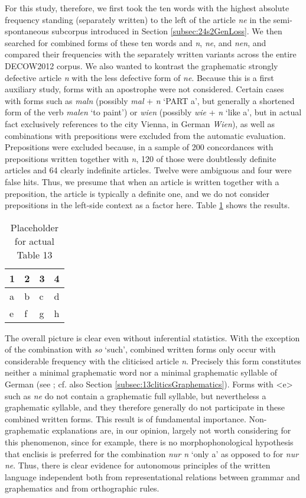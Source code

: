 For this study, therefore, we first took the ten words with the highest absolute frequency standing (separately written) to the left of the article \textit{ne} in the semi-spontaneous subcorpus introduced in Section \ref{subsec:24s2GenLoss}.
We then searched for combined forms of these ten words and \textit{n}, \textit{ne}, and \textit{nen}, and compared their frequencies with the separately written variants across the entire DECOW2012 corpus.
We also wanted to kontrast the graphematic strongly defective article \textit{n} with the less defective form of \textit{ne}.
Because this is a first auxiliary study, forms with an apostrophe were not considered.
Certain cases with forms such as \textit{maln} (possibly \textit{mal} + \textit{n} `\textsc{PART} a', but generally a shortened form of the verb \textit{malen} `to paint') or \textit{wien} (possibly \textit{wie} + \textit{n} `like a', but in actual fact exclusively references to the city Vienna, in German \textit{Wien}), as well as combinations with prepositions were excluded from the automatic evaluation.
Prepositions were excluded because, in a sample of 200 concordances with prepositions written together with \textit{n}, 120 of those were doubtlessly definite articles and 64 clearly indefinite articles.
Twelve were ambiguous and four were false hits.
Thus, we presume that when an article is written together with a preposition, the article is typically a definite one, and we do not consider prepositions in the left-side context as a factor here.
Table \ref{tab:0013} shows the results.

\begin{table}
	\centering
	\begin{tabular}{llll}
		\toprule
		\textbf{1} & \textbf{2} & \textbf{3} & \textbf{4} \\
		\midrule
		a & b & c & d \\
		e & f & g & h \\
		\bottomrule
	\end{tabular}
	\caption{Placeholder for actual Table 13}
	\label{tab:0013}
\end{table}

The overall picture is clear even without inferential statistics.
With the exception of the combination with \textit{so} `such', combined written forms only occur with considerable frequency with the cliticised article \textit{n}.
Precisely this form constitutes neither a minimal graphematic word nor a minimal graphematic syllable of German (see \citealt{Jacobs2005, Fuhrhop2008}; cf. also Section \ref{subsec:13cliticsGraphematics}).
Forms with <e> such as \textit{ne} do not contain a graphematic full syllable, but nevertheless a graphematic syllable, and they therefore generally do not participate in these combined written forms.
This result is of fundamental importance.
Non-graphematic explanations are, in our opinion, largely not worth considering for this phenomenon, since for example, there is no morphophonological hypothesis that enclisis is preferred for the combination \textit{nur n} `only a' as opposed to for \textit{nur ne}.
Thus, there is clear evidence for autonomous principles of the written language independent both from representational relations between grammar and graphematics and from orthographic rules.

